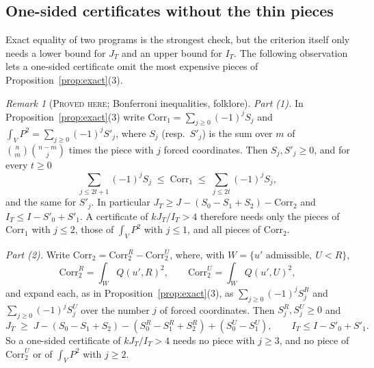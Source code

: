 \documentclass[11pt]{amsart}
\theoremstyle{definition}
\theoremstyle{remark}
\newtheorem{remark}[theorem]{Remark}
\newcommand{\lbl}[1]{\textup{\textsc{#1}}}
\begin{document}
\subsection*{One-sided certificates without the thin pieces}
Exact equality of two programs is the strongest check, but the criterion
itself only needs a lower bound for $J_T$ and an upper bound for $I_T$. The
following observation lets a one-sided certificate omit the most expensive
pieces of Proposition~\ref{prop:exact}(3).

\begin{remark}[\lbl{Proved here}; Bonferroni inequalities, folklore]\label{prop:bonf}
\emph{Part (1).} In Proposition~\ref{prop:exact}(3) write $\mathrm{Corr}_1=\sum_{j\ge0}(-1)^jS_j$
and $\int_VP^2=\sum_{j\ge0}(-1)^jS'_j$, where $S_j$ (resp.\ $S'_j$) is the sum
over $m$ of $\binom nm\binom{n-m}{j}$ times the piece with $j$ forced
coordinates. Then $S_j,S'_j\ge0$, and for every $t\ge0$
\[
\sum_{j\le 2t+1}(-1)^jS_j\;\le\;\mathrm{Corr}_1\;\le\;\sum_{j\le2t}(-1)^jS_j,
\]
and the same for $S'_j$. In particular
$J_T\ge J-\left(S_0-S_1+S_2\right)-\mathrm{Corr}_2$ and
$I_T\le I-S'_0+S'_1$. A certificate of $kJ_T/I_T>4$ therefore needs only
the pieces of $\mathrm{Corr}_1$ with $j\le2$, those of $\int_VP^2$ with
$j\le1$, and all pieces of $\mathrm{Corr}_2$.

\emph{Part (2).} Write $\mathrm{Corr}_2=\mathrm{Corr}_2^{R}-\mathrm{Corr}_2^{U}$, where, with
$W=\{u'\text{ admissible},\ U<R\}$,
\[
\mathrm{Corr}_2^{R}=\int_{W}Q(u',R)^2,\qquad \mathrm{Corr}_2^{U}=\int_{W}Q(u',U)^2,
\]
and expand
each, as in Proposition~\ref{prop:exact}(3), as $\sum_{j\ge0}(-1)^jS^{R}_j$ and
$\sum_{j\ge0}(-1)^jS^{U}_j$ over the number $j$ of forced coordinates. Then
$S^R_j,S^U_j\ge0$ and
\[
J_T\;\ge\;J-\left(S_0-S_1+S_2\right)-\left(S^R_0-S^R_1+S^R_2\right)+\left(S^U_0-S^U_1\right),
\qquad I_T\le I-S'_0+S'_1 .
\]
So a one-sided certificate of $kJ_T/I_T>4$ needs no piece with $j\ge3$, and
no piece of $\mathrm{Corr}_2^U$ or of $\int_VP^2$ with $j\ge2$.
\end{remark}
\end{document}
